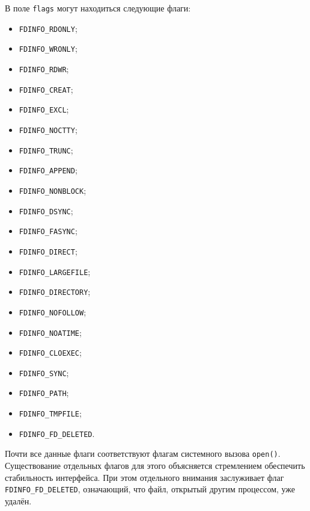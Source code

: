 В поле \texttt{flags} могут находиться следующие флаги:
\begin{itemize}
\item \texttt{FDINFO\_RDONLY};
\item \texttt{FDINFO\_WRONLY};
\item \texttt{FDINFO\_RDWR};
\item \texttt{FDINFO\_CREAT}; 
\item \texttt{FDINFO\_EXCL};
\item \texttt{FDINFO\_NOCTTY};
\item \texttt{FDINFO\_TRUNC};
\item \texttt{FDINFO\_APPEND};
\item \texttt{FDINFO\_NONBLOCK};
\item \texttt{FDINFO\_DSYNC};
\item \texttt{FDINFO\_FASYNC};
\item \texttt{FDINFO\_DIRECT};
\item \texttt{FDINFO\_LARGEFILE};
\item \texttt{FDINFO\_DIRECTORY};
\item \texttt{FDINFO\_NOFOLLOW};
\item \texttt{FDINFO\_NOATIME};
\item \texttt{FDINFO\_CLOEXEC};
\item \texttt{FDINFO\_SYNC};
\item \texttt{FDINFO\_PATH};
\item \texttt{FDINFO\_TMPFILE};
\item \texttt{FDINFO\_FD\_DELETED}.
\end{itemize}

Почти все данные флаги соответствуют флагам системного вызова \texttt{open()}.
Существование отдельных флагов для этого объясняется стремлением обеспечить
стабильность интерфейса. При этом отдельного внимания заслуживает флаг
\texttt{FDINFO\_FD\_DELETED}, означающий, что файл, открытый другим процессом,
уже удалён.
